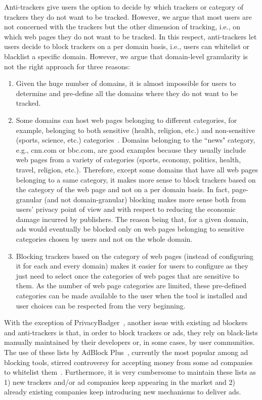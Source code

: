 \documentclass[conference]{IEEEtran}
\begin{document}
Anti-trackers give users the option to decide by which trackers or category of trackers they do not want to be tracked. 
However, we argue that most users are not concerned with the trackers but the other dimension of tracking, i.e., on which web pages they do not want to be tracked.
In this respect, anti-trackers let users decide to block trackers on a per domain basis, i.e., users can whitelist or blacklist a specific domain.
However, we argue that domain-level granularity is not the right approach for three reasons:
\begin{enumerate}
\item Given the huge number of domains, it is almost impossible for users to determine and pre-define all the domains where they do not want to be tracked.
\item Some domains can host web pages belonging to different categories, for example, belonging to both sensitive (health, religion, etc.) and non-sensitive (sports, science, etc.) categories~\cite{handbook_data_protection}.
Domains belonging to the ``news" category, e.g., cnn.com or bbc.com, are good examples because they usually include web pages from a variety of categories (sports, economy, politics, health, travel, religion, etc.).
Therefore, except some domains that have all web pages belonging to a same category, it makes more sense to block trackers based on the category of the web page and not on a per domain basis.
In fact, page-granular (and not domain-granular) blocking makes more sense both from users' privacy point of view and with respect to reducing the economic damage incurred by publishers.
The reason being that, for a given domain, ads would eventually be blocked only on web pages belonging to sensitive categories chosen by users and not on the whole domain.
\item Blocking trackers based on the category of web pages (instead of configuring it for each and every domain) makes it easier for users to configure as they just need to select once the categories of web pages that are sensitive to them.
As the number of web page categories are limited, these pre-defined categories can be made available to the user when the tool is installed and user choices can be respected from the very beginning.
\end{enumerate}

With the exception of PrivacyBadger~\cite{PrivacyBadger16Web}, another issue with existing ad blockers and anti-trackers is that, in order to block trackers or ads, they rely on black-lists manually maintained by their developers or, in some cases, by user communities.
The use of these lists by AdBlock Plus~\cite{AdblockPlus16Web}, currently the most popular among ad blocking tools, stirred controversy for accepting money from some ad companies to whitelist them~\cite{Cookson15FT,rip_adblock_plus}.
Furthermore, it is very cumbersome to maintain these lists as 1) new trackers and/or ad companies keep appearing in the market and 2) already existing companies keep introducing new mechanisms to deliver ads.
\end{document}
